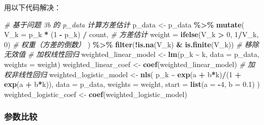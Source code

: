 \documentclass[
]{article}
\newenvironment{Shaded}{\begin{snugshade}}{\end{snugshade}}
\newcommand{\AttributeTok}[1]{\textcolor[rgb]{0.13,0.29,0.53}{#1}}
\newcommand{\CommentTok}[1]{\textcolor[rgb]{0.56,0.35,0.01}{\textit{#1}}}
\newcommand{\DecValTok}[1]{\textcolor[rgb]{0.00,0.00,0.81}{#1}}
\newcommand{\FloatTok}[1]{\textcolor[rgb]{0.00,0.00,0.81}{#1}}
\newcommand{\FunctionTok}[1]{\textcolor[rgb]{0.13,0.29,0.53}{\textbf{#1}}}
\newcommand{\NormalTok}[1]{#1}
\newcommand{\OtherTok}[1]{\textcolor[rgb]{0.56,0.35,0.01}{#1}}
\newcommand{\SpecialCharTok}[1]{\textcolor[rgb]{0.81,0.36,0.00}{\textbf{#1}}}
\begin{document}
用以下代码解决：

\begin{Shaded}
\begin{Highlighting}[]
\CommentTok{\# 基于问题 3b 的 p\_data 计算方差估计}
\NormalTok{p\_data }\OtherTok{\textless{}{-}}\NormalTok{ p\_data }\SpecialCharTok{\%\textgreater{}\%}
\FunctionTok{mutate}\NormalTok{(}
\AttributeTok{V\_k =}\NormalTok{ p\_k }\SpecialCharTok{*}\NormalTok{ (}\DecValTok{1} \SpecialCharTok{{-}}\NormalTok{ p\_k) }\SpecialCharTok{/}\NormalTok{ count, }\CommentTok{\# 方差估计}
\AttributeTok{weight =} \FunctionTok{ifelse}\NormalTok{(V\_k }\SpecialCharTok{\textgreater{}} \DecValTok{0}\NormalTok{, }\DecValTok{1}\SpecialCharTok{/}\NormalTok{V\_k, }\DecValTok{0}\NormalTok{) }\CommentTok{\# 权重（方差的倒数）}
\NormalTok{) }\SpecialCharTok{\%\textgreater{}\%}
\FunctionTok{filter}\NormalTok{(}\SpecialCharTok{!}\FunctionTok{is.na}\NormalTok{(V\_k) }\SpecialCharTok{\&} \FunctionTok{is.finite}\NormalTok{(V\_k)) }\CommentTok{\# 移除无效值}
\CommentTok{\# 加权线性回归}
\NormalTok{weighted\_linear\_model }\OtherTok{\textless{}{-}} \FunctionTok{lm}\NormalTok{(p\_k }\SpecialCharTok{\textasciitilde{}}\NormalTok{ k, }\AttributeTok{data =}\NormalTok{ p\_data, }\AttributeTok{weights =}\NormalTok{ weight)}
\NormalTok{weighted\_linear\_coef }\OtherTok{\textless{}{-}} \FunctionTok{coef}\NormalTok{(weighted\_linear\_model)}
\CommentTok{\# 加权非线性回归}
\NormalTok{weighted\_logistic\_model }\OtherTok{\textless{}{-}} \FunctionTok{nls}\NormalTok{(}
\NormalTok{p\_k }\SpecialCharTok{\textasciitilde{}} \FunctionTok{exp}\NormalTok{(a }\SpecialCharTok{+}\NormalTok{ b}\SpecialCharTok{*}\NormalTok{k)}\SpecialCharTok{/}\NormalTok{(}\DecValTok{1} \SpecialCharTok{+} \FunctionTok{exp}\NormalTok{(a }\SpecialCharTok{+}\NormalTok{ b}\SpecialCharTok{*}\NormalTok{k)),}
\AttributeTok{data =}\NormalTok{ p\_data,}
\AttributeTok{weights =}\NormalTok{ weight,}
\AttributeTok{start =} \FunctionTok{list}\NormalTok{(}\AttributeTok{a =} \SpecialCharTok{{-}}\DecValTok{4}\NormalTok{, }\AttributeTok{b =} \FloatTok{0.1}\NormalTok{)}
\NormalTok{)}
\NormalTok{weighted\_logistic\_coef }\OtherTok{\textless{}{-}} \FunctionTok{coef}\NormalTok{(weighted\_logistic\_model)}
\end{Highlighting}
\end{Shaded}

\subsubsection{参数比较}\label{ux53c2ux6570ux6bd4ux8f83}
\end{document}
